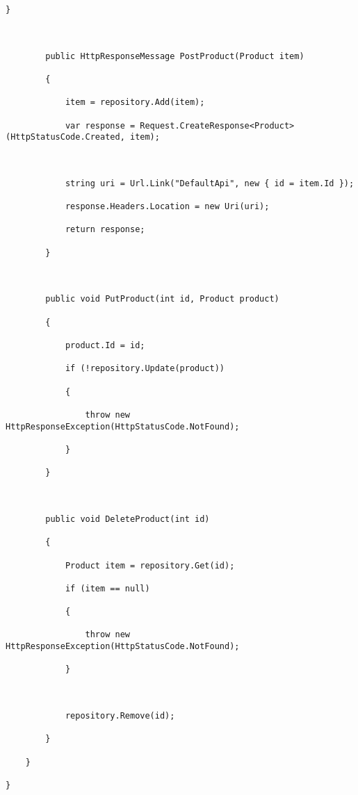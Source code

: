 \documentclass[a4paper,10pt]{scrreprt}
\begin{document}
\begin{lstlisting}[caption=WebApi Example]
        }



        public HttpResponseMessage PostProduct(Product item)

        {

            item = repository.Add(item);

            var response = Request.CreateResponse<Product>(HttpStatusCode.Created, item);



            string uri = Url.Link("DefaultApi", new { id = item.Id });

            response.Headers.Location = new Uri(uri);

            return response;

        }



        public void PutProduct(int id, Product product)

        {

            product.Id = id;

            if (!repository.Update(product))

            {

                throw new HttpResponseException(HttpStatusCode.NotFound);

            }

        }



        public void DeleteProduct(int id)

        {

            Product item = repository.Get(id);

            if (item == null)

            {

                throw new HttpResponseException(HttpStatusCode.NotFound);

            }



            repository.Remove(id);

        }

    }

}
\end{lstlisting}
\end{document}
